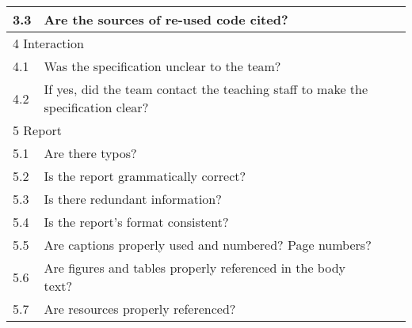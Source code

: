 \documentclass[%
	a4paper,
]
{article}
\begin{document}
\begin{table}[h!]
\begin{tabular}{
		|p{.025\linewidth}
		|p{.75\linewidth}
		|p{.05\linewidth}
		|p{.05\linewidth}|
	}
		3.3 & Are the sources of re-used code cited? & & \\\hline

		\multicolumn{4}{|p{.95\linewidth}|}{\cellcolor{gray!20} 4 Interaction}
			\\\hline

		4.1 & Was the specification unclear to the team? & & \\\hline

		4.2 & If yes, did the team contact the teaching staff to make the specification
			clear? & & \\\hline

		\multicolumn{4}{|p{.95\linewidth}|}{\cellcolor{gray!20} 5 Report}
			\\\hline

		5.1 & Are there typos? & & \\\hline

		5.2 & Is the report grammatically correct? & & \\\hline

		5.3 & Is there redundant information? & & \\\hline

		5.4 & Is the report's format consistent? & & \\\hline

		5.5 & Are captions properly used and numbered? Page numbers? & & \\\hline

		5.6 & Are figures and tables properly referenced in the body text?
			& & \\\hline

		5.7 & Are resources properly referenced? & & \\\hline


		\hline

	\end{tabular}
\end{table}
%
%
%
%
%
\end{document}
